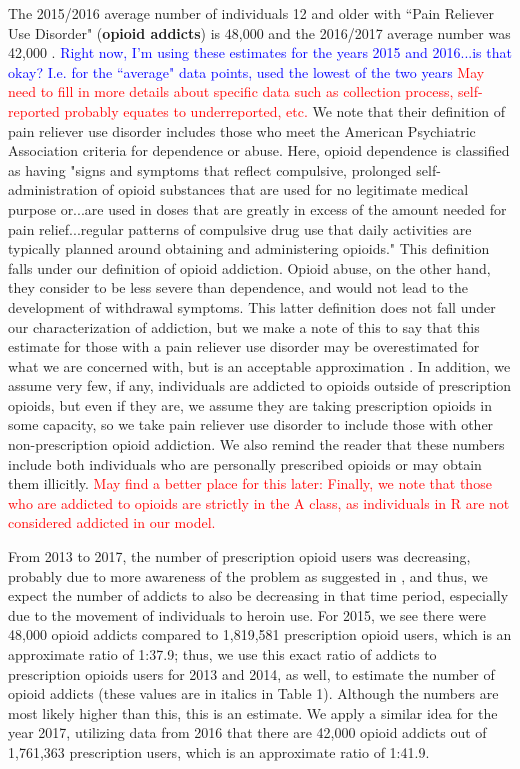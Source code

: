 \documentclass[12pt]{article}
\begin{document}
The 2015/2016 average number of individuals 12 and older with ``Pain Reliever Use Disorder" (\textbf{opioid addicts}) is 48,000 and the 2016/2017 average number was 42,000 \cite{NSDUH2, NSDUH3}. \textcolor{blue}{Right now, I'm using these estimates for the years 2015 and 2016...is that okay? I.e. for the ``average" data points, used the lowest of the two years} \textcolor{red}{May need to fill in more details about specific data such as collection process, self-reported probably equates to underreported, etc.}
We note that their definition of pain reliever use disorder includes those who meet the American Psychiatric Association criteria for dependence or abuse. Here, opioid dependence is classified as having "signs and symptoms that reflect compulsive, prolonged self-administration of opioid substances that are used for no legitimate medical purpose or...are used in doses that are greatly in excess of the amount needed for pain relief...regular patterns of compulsive drug use that daily activities are typically planned around obtaining and administering opioids." This definition falls under our definition of opioid addiction. Opioid abuse, on the other hand, they consider to be less severe than dependence, and would not lead to the development of withdrawal symptoms. This latter definition does not fall under our characterization of addiction, but we make a note of this to say that this estimate for those with a pain reliever use disorder may be overestimated for what we are concerned with, but is an acceptable approximation \cite{DSM}. In addition, we assume very few, if any, individuals are addicted to opioids outside of prescription opioids, but even if they are, we assume they are taking prescription opioids in some capacity, so we take pain reliever use disorder to include those with other non-prescription opioid addiction. We also remind the reader that these numbers include both individuals who are personally prescribed opioids or may obtain them illicitly.   \textcolor{red}{May find a better place for this later: Finally, we note that those who are addicted to opioids are strictly in the A class, as individuals in R are not considered addicted in our model.} 

From 2013 to 2017, the number of prescription opioid users was decreasing, probably due to more awareness of the problem as suggested in \cite{CDC7}, and thus, we expect the number of addicts to also be decreasing in that time period, especially due to the movement of individuals to heroin use. For 2015, we see there were 48,000 opioid addicts compared to 1,819,581 prescription opioid users, which is an approximate ratio of 1:37.9; thus, we use this exact ratio of addicts to prescription opioids users for 2013 and 2014, as well, to estimate the number of opioid addicts (these values are in italics in Table 1). Although the numbers are most likely higher than this, this is an estimate. We apply a similar idea for the year 2017, utilizing data from 2016 that there are 42,000 opioid addicts out of 1,761,363 prescription users, which is an approximate ratio of 1:41.9. 
\end{document}
